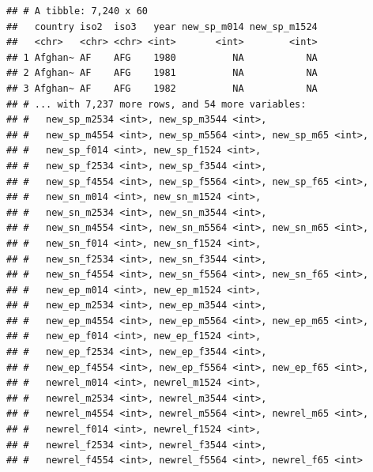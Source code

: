 \documentclass[]{book}
\newenvironment{Shaded}{}{}
\newcommand{\DataTypeTok}[1]{#1}
\newcommand{\KeywordTok}[1]{\textcolor[rgb]{0.00,0.00,1.00}{#1}}
\newcommand{\NormalTok}[1]{#1}
\newcommand{\OperatorTok}[1]{#1}
\newcommand{\StringTok}[1]{\textcolor[rgb]{0.00,0.50,0.50}{#1}}
\begin{document}
\begin{Shaded}
\end{Shaded}

\begin{verbatim}
## # A tibble: 7,240 x 60
##   country iso2  iso3   year new_sp_m014 new_sp_m1524
##   <chr>   <chr> <chr> <int>       <int>        <int>
## 1 Afghan~ AF    AFG    1980          NA           NA
## 2 Afghan~ AF    AFG    1981          NA           NA
## 3 Afghan~ AF    AFG    1982          NA           NA
## # ... with 7,237 more rows, and 54 more variables:
## #   new_sp_m2534 <int>, new_sp_m3544 <int>,
## #   new_sp_m4554 <int>, new_sp_m5564 <int>, new_sp_m65 <int>,
## #   new_sp_f014 <int>, new_sp_f1524 <int>,
## #   new_sp_f2534 <int>, new_sp_f3544 <int>,
## #   new_sp_f4554 <int>, new_sp_f5564 <int>, new_sp_f65 <int>,
## #   new_sn_m014 <int>, new_sn_m1524 <int>,
## #   new_sn_m2534 <int>, new_sn_m3544 <int>,
## #   new_sn_m4554 <int>, new_sn_m5564 <int>, new_sn_m65 <int>,
## #   new_sn_f014 <int>, new_sn_f1524 <int>,
## #   new_sn_f2534 <int>, new_sn_f3544 <int>,
## #   new_sn_f4554 <int>, new_sn_f5564 <int>, new_sn_f65 <int>,
## #   new_ep_m014 <int>, new_ep_m1524 <int>,
## #   new_ep_m2534 <int>, new_ep_m3544 <int>,
## #   new_ep_m4554 <int>, new_ep_m5564 <int>, new_ep_m65 <int>,
## #   new_ep_f014 <int>, new_ep_f1524 <int>,
## #   new_ep_f2534 <int>, new_ep_f3544 <int>,
## #   new_ep_f4554 <int>, new_ep_f5564 <int>, new_ep_f65 <int>,
## #   newrel_m014 <int>, newrel_m1524 <int>,
## #   newrel_m2534 <int>, newrel_m3544 <int>,
## #   newrel_m4554 <int>, newrel_m5564 <int>, newrel_m65 <int>,
## #   newrel_f014 <int>, newrel_f1524 <int>,
## #   newrel_f2534 <int>, newrel_f3544 <int>,
## #   newrel_f4554 <int>, newrel_f5564 <int>, newrel_f65 <int>
\end{verbatim}

\begin{Shaded}
\end{Shaded}
\end{document}
